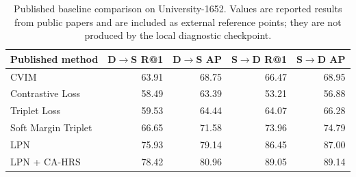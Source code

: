 \begin{table}[!t]
\centering
\footnotesize
\caption{Published baseline comparison on University-1652. Values are reported results from public papers and are included as external reference points; they are not produced by the local diagnostic checkpoint.}
\label{tab:publication_baselines}
\begin{tabular}{lrrrr}
\toprule
Published method & D$\rightarrow$S R@1 & D$\rightarrow$S AP & S$\rightarrow$D R@1 & S$\rightarrow$D AP \\
\midrule
CVIM \cite{cahrs2022} & 63.91 & 68.75 & 66.47 & 68.95 \\
Contrastive Loss \cite{cahrs2022} & 58.49 & 63.39 & 53.21 & 56.88 \\
Triplet Loss \cite{cahrs2022} & 59.53 & 64.44 & 64.07 & 66.28 \\
Soft Margin Triplet \cite{cahrs2022} & 66.65 & 71.58 & 73.96 & 74.79 \\
LPN \cite{lpn2022} & 75.93 & 79.14 & 86.45 & 87.00 \\
LPN + CA-HRS \cite{cahrs2022} & 78.42 & 80.96 & 89.05 & 89.14 \\
\bottomrule
\end{tabular}
\end{table}

